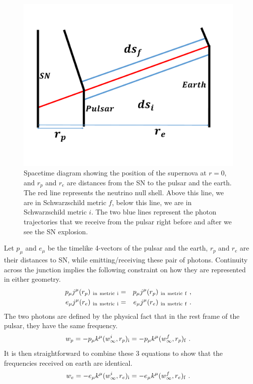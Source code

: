 \documentclass[aps,showpacs,onecolumn,floats,prd,superscriptaddress,nofootinbib]{revtex4}
\begin{document}
\begin{figure}[tb!]
\begin{center}
\includegraphics[scale = 0.3]{Image2.pdf}
\caption{Spacetime diagram showing the position of the supernova at $r=0$, and $r_p$ and $r_e$ are distances from the SN to the pulsar and the earth. The red line represents the neutrino null shell. Above this line, we are in Schwarzschild metric $f$, below this line, we are in Schwarzschild metric $i$. The two blue lines represent the photon trajectories that we receive from the pulsar right before and after we see the SN explosion.}
\label{fig:1}
\end{center}
\end{figure}

Let $p_\mu$ and $e_\mu$ be the timelike 4-vectors of the pulsar and the earth, $r_p$ and $r_e$ are their distances to SN, while emitting/receiving these pair of photons. Continuity across the junction implies the following constraint on how they are represented in either geometry.
\begin{eqnarray}
p_\mu j^\mu(r_p)_{\rm \ in \ metric \ i} &=& 
p_\mu j^\mu(r_p)_{\rm \ in \ metric \ f}~,
\label{eq-JuncPuls} \\ 
e_\mu j^\mu(r_e)_{\rm \ in \ metric \ i} &=& 
e_\mu j^\mu(r_e)_{\rm \ in \ metric \ f}~.
\end{eqnarray}
The two photons are defined by the physical fact that in the rest frame of the pulsar, they have the same frequency.
\begin{equation}
w_p = -p_\mu k^\mu(w^i_\infty, r_p)_{\rm i} = 
-p_\mu k^\mu(w^f_\infty, r_p)_{\rm f}~.
\label{eq-PulsEmit}
\end{equation}
It is then straightforward to combine these 3 equations to show that the frequencies received on earth are identical.
\begin{equation}
w_e = -e_\mu k^\mu(w^i_\infty, r_e)_{\rm i} = 
-e_\mu k^\mu(w^f_\infty, r_e)_{\rm f}~.
\end{equation}
\end{document}
